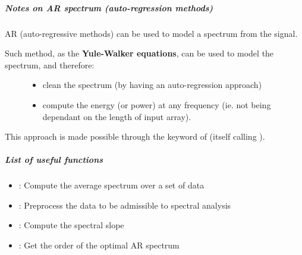 \documentclass[letterpaper,10pt,english]{sphinxmanual}
\begin{document}
\subparagraph{Notes on AR spectrum (auto-regression methods)}
\label{altimetry.tools.spectrum:notes-on-ar-spectrum-auto-regression-methods}
AR (auto-regressive methods) can be used to model a spectrum from the signal.
\begin{description}
\item[{Such method, as the \textbf{Yule-Walker equations}, can be used to model the spectrum, and therefore:}] \leavevmode\begin{itemize}
\item {} 
clean the spectrum (by having an auto-regression approach)

\item {} 
compute the energy (or power) at any frequency (ie. not being dependant on the length of input array).

\end{itemize}

\end{description}

This approach is made possible through the  keyword of {\hyperref[altimetry.tools.spectrum:altimetry.tools.spectrum.spectral_analysis]{\emph{}}} (itself calling {\hyperref[altimetry.tools.spectrum:altimetry.tools.spectrum.yule_walker_regression]{\emph{}}}).


\subparagraph{List of useful functions}
\label{altimetry.tools.spectrum:list-of-useful-functions}\begin{itemize}
\item {} 
{\hyperref[altimetry.tools.spectrum:altimetry.tools.spectrum.spectral_analysis]{\emph{}}} : Compute the average spectrum over a set of data

\item {} 
{\hyperref[altimetry.tools.spectrum:altimetry.tools.spectrum.preprocess]{\emph{}}} : Preprocess the data to be admissible to spectral analysis

\item {} 
{\hyperref[altimetry.tools.spectrum:altimetry.tools.spectrum.get_slope]{\emph{}}} : Compute the spectral slope

\item {} 
{\hyperref[altimetry.tools.spectrum:altimetry.tools.spectrum.optimal_AR_spectrum]{\emph{}}} : Get the order of the optimal AR spectrum

\end{itemize}
\end{document}
